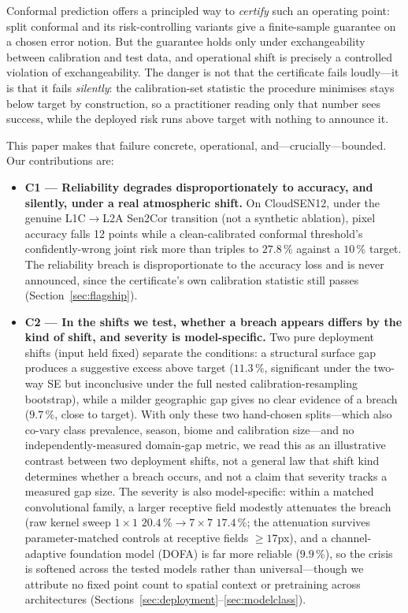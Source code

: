 \documentclass[preprint,3p,times]{elsarticle}
\begin{document}
Conformal prediction offers a principled way to \emph{certify} such an operating point: split conformal and its risk-controlling variants give a finite-sample guarantee on a chosen error notion. But the guarantee holds only under exchangeability between calibration and test data, and operational shift is precisely a controlled violation of exchangeability. The danger is not that the certificate fails loudly---it is that it fails \emph{silently}: the calibration-set statistic the procedure minimises stays below target by construction, so a practitioner reading only that number sees success, while the deployed risk runs above target with nothing to announce it.

This paper makes that failure concrete, operational, and---crucially---bounded. Our contributions are:
\begin{itemize}
\item \textbf{C1 --- Reliability degrades disproportionately to accuracy, and silently, under a real atmospheric shift.} On CloudSEN12, under the genuine L1C$\to$L2A Sen2Cor transition (not a synthetic ablation), pixel accuracy falls 12 points while a clean-calibrated conformal threshold's confidently-wrong joint risk more than triples to $27.8\,\%$ against a $10\,\%$ target. The reliability breach is disproportionate to the accuracy loss and is never announced, since the certificate's own calibration statistic still passes (Section~\ref{sec:flagship}).
\item \textbf{C2 --- In the shifts we test, whether a breach appears differs by the kind of shift, and severity is model-specific.} Two pure deployment shifts (input held fixed) separate the conditions: a structural surface gap produces a suggestive excess above target ($11.3\,\%$, significant under the two-way SE but inconclusive under the full nested calibration-resampling bootstrap), while a milder geographic gap gives no clear evidence of a breach ($9.7\,\%$, close to target). With only these two hand-chosen splits---which also co-vary class prevalence, season, biome and calibration size---and no independently-measured domain-gap metric, we read this as an illustrative contrast between two deployment shifts, not a general law that shift kind determines whether a breach occurs, and not a claim that severity tracks a measured gap size. The severity is also model-specific: within a matched convolutional family, a larger receptive field modestly attenuates the breach (raw kernel sweep $1\times1$ $20.4\,\% \to 7\times7$ $17.4\,\%$; the attenuation survives parameter-matched controls at receptive fields ${\geq}17$px), and a channel-adaptive foundation model (DOFA) is far more reliable ($9.9\,\%$), so the crisis is softened across the tested models rather than universal---though we attribute no fixed point count to spatial context or pretraining across architectures (Sections~\ref{sec:deployment}--\ref{sec:modelclass}).

\end{itemize}
\end{document}
